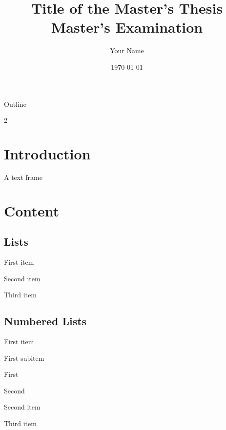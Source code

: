 \documentclass{beamer} %
\title[Master's Thesis]{Title of the Master's Thesis\\Master's Examination}
\author{Your Name}
\institute{Institute of …}
\date{\today}
\begin{document}
\begin{frame}
  \maketitle
\end{frame}


\begin{frame}{Outline}
    \begin{multicols}{2}
        \tableofcontents
    \end{multicols}
\end{frame}


\section{Introduction}

\begin{frame}{}
  A text frame
\end{frame}


\section{Content}

\subsection{Lists}

\begin{frame}{}
  \begin{tugitemize}
    \item First item
    \item Second item
    \item Third item
  \end{tugitemize}
\end{frame}


\subsection{Numbered Lists}

\begin{frame}{}
  \begin{tugenumerate}
    \item First item
      \begin{tugenumerate}
        \item First subitem
          \begin{tugenumerate}
            \item First
            \item Second
          \end{tugenumerate}
      \end{tugenumerate}
    \item<2-> Second item
    \item<3-> Third item
  \end{tugenumerate}
\end{frame}
\end{document}
